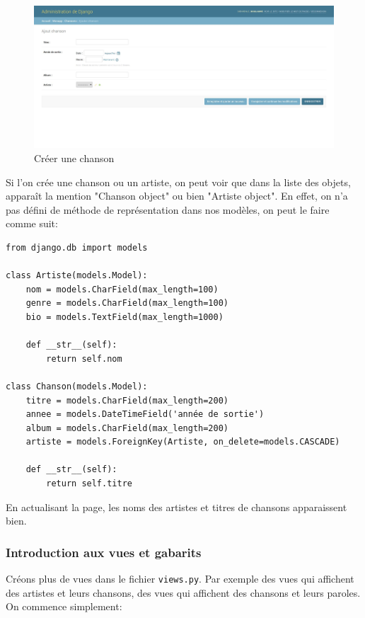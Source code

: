 \documentclass[a4paper, 10pt]{article}
\begin{document}
\begin{figure}[h]
    \begin{center}
        \includegraphics[width=15 cm]{django/admin3.jpg}
        \caption{Créer une chanson}\label{admin3}
    \end{center}
\end{figure}

Si l'on crée une chanson ou un artiste, on peut voir que dans la liste des objets, apparaît la mention "Chanson object" ou bien "Artiste object". En effet, on n'a pas défini de méthode de représentation dans nos modèles, on peut le faire comme suit:
\begin{verbatim}
from django.db import models

class Artiste(models.Model):
    nom = models.CharField(max_length=100)
    genre = models.CharField(max_length=100)
    bio = models.TextField(max_length=1000)

    def __str__(self):
        return self.nom

class Chanson(models.Model):
    titre = models.CharField(max_length=200)
    annee = models.DateTimeField('année de sortie')
    album = models.CharField(max_length=200)
    artiste = models.ForeignKey(Artiste, on_delete=models.CASCADE)

    def __str__(self):
        return self.titre
\end{verbatim}

En actualisant la page, les noms des artistes et titres de chansons apparaissent bien.

\subsubsection{Introduction aux vues et gabarits}
Créons plus de vues dans le fichier \texttt{views.py}. Par exemple des vues qui affichent des artistes et leurs chansons, des vues qui affichent des chansons et leurs paroles. On commence simplement:
\end{document}
